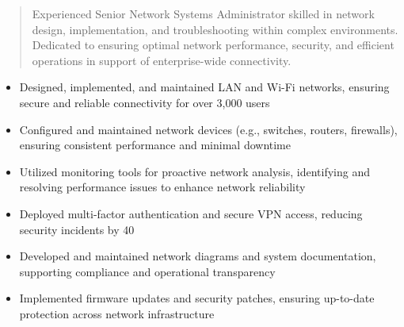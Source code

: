 



\makecvheader

\begin{quote}
  \noindent
  Experienced Senior Network Systems Administrator skilled in network design, implementation, and troubleshooting within complex environments. Dedicated to ensuring optimal network performance, security, and efficient operations in support of enterprise-wide connectivity.
\end{quote}

\par\smallskip
\noindent
\begin{minipage}{20cm}
  \begin{minipage}{9.75cm}
    \begin{itemize}
      \item Designed, implemented, and maintained LAN and Wi-Fi networks, ensuring secure and reliable connectivity for over 3,000 users
      \item Configured and maintained network devices (e.g., switches, routers, firewalls), ensuring consistent performance and minimal downtime
      \item Utilized monitoring tools for proactive network analysis, identifying and resolving performance issues to enhance network reliability
    \end{itemize}
  \end{minipage}
  \hfill
  \begin{minipage}{9.75cm}
    \begin{itemize}
      \item Deployed multi-factor authentication and secure VPN access, reducing security incidents by 40%
      \item Developed and maintained network diagrams and system documentation, supporting compliance and operational transparency
      \item Implemented firmware updates and security patches, ensuring up-to-date protection across network infrastructure
    \end{itemize}
  \end{minipage}
\end{minipage}
\par\smallskip
\divider

